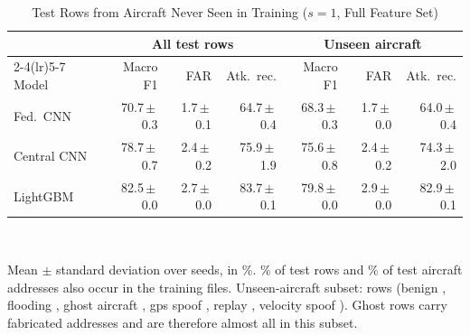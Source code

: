 \begin{table}[t]
\centering
\scriptsize
\caption{Test Rows from Aircraft Never Seen in Training ($s=1$, Full Feature Set)}
\label{tab:unseen}
\setlength{\tabcolsep}{3pt}
\begin{tabular}{lrrrrrr}
\toprule
& \multicolumn{3}{c}{All test rows} & \multicolumn{3}{c}{Unseen aircraft} \\
\cmidrule(lr){2-4}\cmidrule(lr){5-7}
Model & Macro F1 & FAR & Atk.\ rec. & Macro F1 & FAR & Atk.\ rec. \\
\midrule
Fed.\ CNN & 70.7{\,}$\pm${\,}0.3 & 1.7{\,}$\pm${\,}0.1 & 64.7{\,}$\pm${\,}0.4 & 68.3{\,}$\pm${\,}0.3 & 1.7{\,}$\pm${\,}0.0 & 64.0{\,}$\pm${\,}0.4 \\
Central CNN & 78.7{\,}$\pm${\,}0.7 & 2.4{\,}$\pm${\,}0.2 & 75.9{\,}$\pm${\,}1.9 & 75.6{\,}$\pm${\,}0.8 & 2.4{\,}$\pm${\,}0.2 & 74.3{\,}$\pm${\,}2.0 \\
LightGBM & 82.5{\,}$\pm${\,}0.0 & 2.7{\,}$\pm${\,}0.0 & 83.7{\,}$\pm${\,}0.1 & 79.8{\,}$\pm${\,}0.0 & 2.9{\,}$\pm${\,}0.0 & 82.9{\,}$\pm${\,}0.1 \\
\bottomrule
\end{tabular}
\\[2pt]
\parbox{\linewidth}{\scriptsize Mean $\pm$ standard deviation over  seeds, in \%. \% of test rows and \% of test aircraft addresses also occur in the training files. Unseen-aircraft subset:  rows (benign , flooding , ghost aircraft , gps spoof , replay , velocity spoof ). Ghost rows carry fabricated addresses and are therefore almost all in this subset.}
\end{table}
